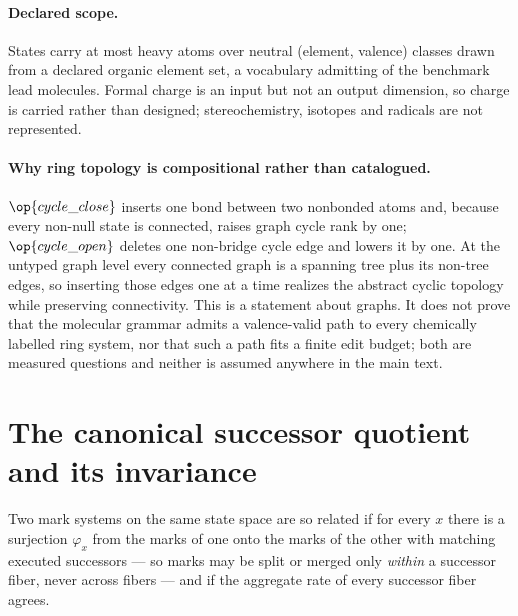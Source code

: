 \paragraph{Declared scope.}
States carry at most \XXX{} heavy atoms over \XXX{} neutral (element, valence) classes drawn from a declared organic element set, a vocabulary admitting \XXX{} of the benchmark lead molecules.
Formal charge is an input but not an output dimension, so charge is carried rather than designed; stereochemistry, isotopes and radicals are not represented.

\paragraph{Why ring topology is compositional rather than catalogued.}
$\op{cycle\_close}$ inserts one bond between two nonbonded atoms and, because every non-null state is connected, raises graph cycle rank by one; $\op{cycle\_open}$ deletes one non-bridge cycle edge and lowers it by one.
At the untyped graph level every connected graph is a spanning tree plus its non-tree edges, so inserting those edges one at a time realizes the abstract cyclic topology while preserving connectivity.
This is a statement about graphs.
It does not prove that the molecular grammar admits a valence-valid path to every chemically labelled ring system, nor that such a path fits a finite edit budget; both are measured questions and neither is assumed anywhere in the main text.

\section{The canonical successor quotient and its invariance}
\label{app:quotient}

\begin{definition}
\label{def:reencoding}
Two mark systems on the same state space are so related if for every $x$ there is a surjection $\varphi_x$ from the marks of one onto the marks of the other with matching executed successors --- so marks may be split or merged only \emph{within} a successor fiber, never across fibers --- and if the aggregate rate of every successor fiber agrees.
\end{definition}

